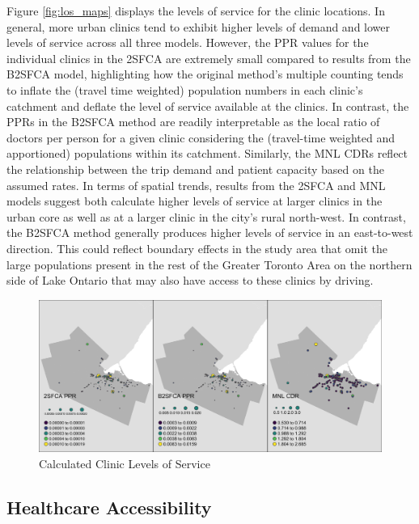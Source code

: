 \documentclass[]{elsarticle} %
\begin{document}
Figure \ref{fig:los_maps} displays the levels of service for the clinic
locations. In general, more urban clinics tend to exhibit higher levels
of demand and lower levels of service across all three models. However,
the PPR values for the individual clinics in the 2SFCA are extremely
small compared to results from the B2SFCA model, highlighting how the
original method's multiple counting tends to inflate the (travel time
weighted) population numbers in each clinic's catchment and deflate the
level of service available at the clinics. In contrast, the PPRs in the
B2SFCA method are readily interpretable as the local ratio of doctors
per person for a given clinic considering the (travel-time weighted and
apportioned) populations within its catchment. Similarly, the MNL CDRs
reflect the relationship between the trip demand and patient capacity
based on the assumed rates. In terms of spatial trends, results from the
2SFCA and MNL models suggest both calculate higher levels of service at
larger clinics in the urban core as well as at a larger clinic in the
city's rural north-west. In contrast, the B2SFCA method generally
produces higher levels of service in an east-to-west direction. This
could reflect boundary effects in the study area that omit the large
populations present in the rest of the Greater Toronto Area on the
northern side of Lake Ontario that may also have access to these clinics
by driving.

\begin{figure}
\includegraphics[width=1\linewidth]{./img/los_maps} \caption{\label{fig:los_maps}Calculated Clinic Levels of Service}\label{fig:los_maps_fig}
\end{figure}

\hypertarget{healthcare-accessibility}{%
\subsection{Healthcare Accessibility}\label{healthcare-accessibility}}
\end{document}
